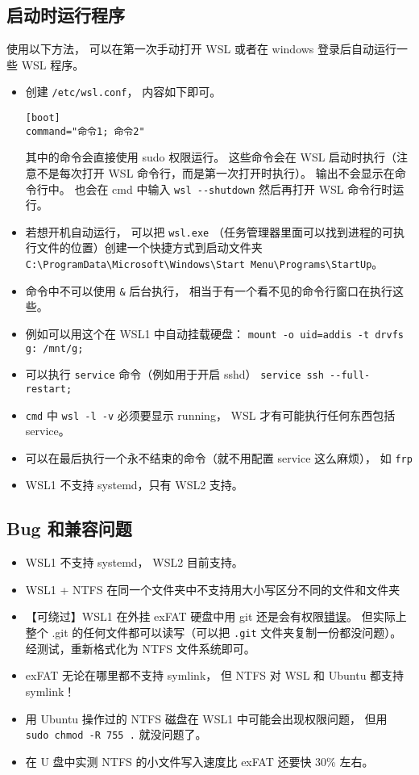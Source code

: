 \subsection{启动时运行程序}
使用以下方法， 可以在第一次手动打开 WSL 或者在 windows 登录后自动运行一些 WSL 程序。

\begin{itemize}
\item 创建 \verb|/etc/wsl.conf|， 内容如下即可。
\begin{lstlisting}[language=none]
[boot]
command="命令1; 命令2"
\end{lstlisting}
其中的命令会直接使用 sudo 权限运行。 这些命令会在 WSL 启动时执行（注意不是每次打开 WSL 命令行，而是第一次打开时执行）。 输出不会显示在命令行中。 也会在 cmd 中输入 \verb|wsl --shutdown| 然后再打开 WSL 命令行时运行。
\item 若想开机自动运行， 可以把 \verb|wsl.exe| （任务管理器里面可以找到进程的可执行文件的位置）创建一个快捷方式到启动文件夹 \verb|C:\ProgramData\Microsoft\Windows\Start Menu\Programs\StartUp|。
\item 命令中不可以使用 \verb|&| 后台执行， 相当于有一个看不见的命令行窗口在执行这些。
\item 例如可以用这个在 WSL1 中自动挂载硬盘： \verb|mount -o uid=addis -t drvfs g: /mnt/g;|
\item 可以执行 \verb|service| 命令（例如用于开启 sshd） \verb|service ssh --full-restart;|
\item \verb|cmd| 中 \verb|wsl -l -v| 必须要显示 running， WSL 才有可能执行任何东西包括 service。
\item 可以在最后执行一个永不结束的命令（就不用配置 service 这么麻烦）， 如 \verb|frp|
\item WSL1 不支持 systemd，只有 WSL2 支持。
\end{itemize}

\subsection{Bug 和兼容问题}
\begin{itemize}
\item WSL1 不支持 systemd， WSL2 目前支持。
\item WSL1 + NTFS 在同一个文件夹中不支持用大小写区分不同的文件和文件夹
\item 【可绕过】WSL1 在外挂 exFAT 硬盘中用 git 还是会有权限\href{https://github.com/microsoft/WSL/issues/5179}{错误}。 但实际上整个 .git 的任何文件都可以读写（可以把 \verb|.git| 文件夹复制一份都没问题）。 经测试，重新格式化为 NTFS 文件系统即可。
\item  exFAT 无论在哪里都不支持 symlink， 但 NTFS 对 WSL 和 Ubuntu 都支持 symlink！
\item 用 Ubuntu 操作过的 NTFS 磁盘在 WSL1 中可能会出现权限问题， 但用 \verb|sudo chmod -R 755 .| 就没问题了。
\item 在 U 盘中实测 NTFS 的小文件写入速度比 exFAT 还要快 30\% 左右。
\end{itemize}
